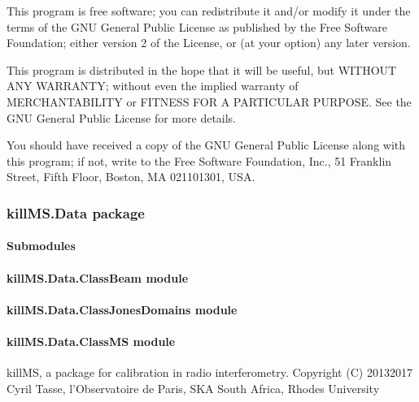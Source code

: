 \documentclass[letterpaper,10pt,english]{sphinxmanual}
\begin{document}
\sphinxAtStartPar
This program is free software; you can redistribute it and/or
modify it under the terms of the GNU General Public License
as published by the Free Software Foundation; either version 2
of the License, or (at your option) any later version.

\sphinxAtStartPar
This program is distributed in the hope that it will be useful,
but WITHOUT ANY WARRANTY; without even the implied warranty of
MERCHANTABILITY or FITNESS FOR A PARTICULAR PURPOSE.  See the
GNU General Public License for more details.

\sphinxAtStartPar
You should have received a copy of the GNU General Public License
along with this program; if not, write to the Free Software
Foundation, Inc., 51 Franklin Street, Fifth Floor, Boston, MA  02110\sphinxhyphen{}1301, USA.

\sphinxstepscope


\subsubsection{killMS.Data package}
\label{\detokenize{api/killMS.Data:killms-data-package}}\label{\detokenize{api/killMS.Data::doc}}

\paragraph{Submodules}
\label{\detokenize{api/killMS.Data:submodules}}

\paragraph{killMS.Data.ClassBeam module}
\label{\detokenize{api/killMS.Data:killms-data-classbeam-module}}

\paragraph{killMS.Data.ClassJonesDomains module}
\label{\detokenize{api/killMS.Data:killms-data-classjonesdomains-module}}

\paragraph{killMS.Data.ClassMS module}
\label{\detokenize{api/killMS.Data:module-killMS.Data.ClassMS}}\label{\detokenize{api/killMS.Data:killms-data-classms-module}}
\sphinxAtStartPar
killMS, a package for calibration in radio interferometry.
Copyright (C) 2013\sphinxhyphen{}2017  Cyril Tasse, l’Observatoire de Paris,
SKA South Africa, Rhodes University
\end{document}
